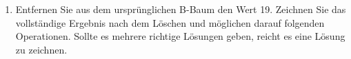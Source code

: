 \documentclass{lehramt-informatik-aufgabe}
\begin{document}
\begin{enumerate}
\begin{liAntwort}

\end{liAntwort}


\item Entfernen Sie aus dem ursprünglichen B-Baum den Wert 19. Zeichnen
Sie das vollständige Ergebnis nach dem Löschen und möglichen darauf
folgenden Operationen. Sollte es mehrere richtige Lösungen geben, reicht
es eine Lösung zu zeichnen.

\begin{liAntwort}

\end{liAntwort}

\end{enumerate}
\end{document}
